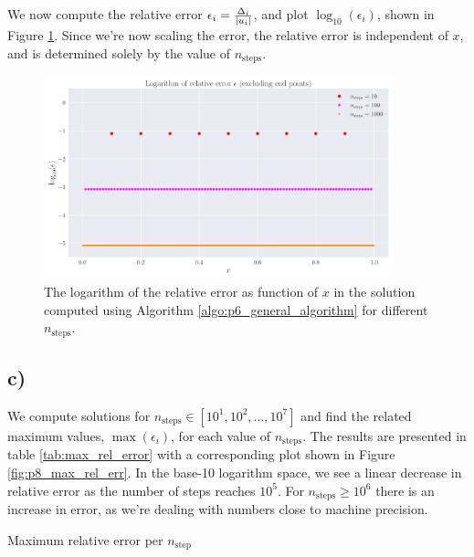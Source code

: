 \documentclass[english,notitlepage,nofootinbib]{revtex4-1}  %
\newcommand{\Fig}[1]{Figure \ref{fig:#1}}
\newcommand{\Algo}[1]{Algorithm \ref{algo:#1}}
\begin{document}
We now compute the relative error $\epsilon_i= \frac{\Delta_i}{\abs{u_i}}$, and plot $\log_{10}(\epsilon_i)$, shown in \Fig{p8_rel_err}. Since we're now scaling the error, the relative error is independent of $x$, and is determined solely by the value of $n_{\mathrm{steps}}$.

\begin{figure}[h!]
    \centering
    \includegraphics[width=0.9\textwidth]{relative_error.pdf}
    \caption{The logarithm of the relative error as function of $x$ in the solution computed using \Algo{p6_general_algorithm} for different $n_\text{steps}$.}\label{fig:p8_rel_err}
\end{figure}

\subsection*{c)}
We compute solutions for $n_\text{steps}\in[10^1, 10^2, \dots, 10^7]$ and find the related maximum values, $\max{(\epsilon_i)}$, for each value of $n_\mathrm{steps}$. The results are presented in table \ref{tab:max_rel_error} with a corresponding plot shown in \Fig{p8_max_rel_err}. In the base-10 logarithm space, we see a linear decrease in relative error as the number of steps reaches $10^5$. For $n_\text{steps}\geq 10^6$ there is an increase in error, as we're dealing with numbers close to machine precision.

\begin{table}[h!]
    \caption{Maximum relative error per $n_{\mathrm{step}}$}
    \label{tab:max_rel_error}  
    
\end{table}
\end{document}
